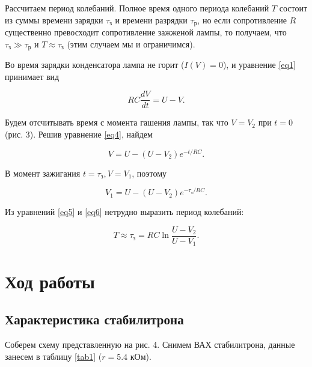 \documentclass[a4paper,14pt]{article}
\begin{document}
Рассчитаем период колебаний. Полное время одного периода колебаний $T$ состоит из суммы времени зарядки $\tau_{\text{з}}$ и времени разрядки $\tau_{\text{р}}$, но если сопротивление $R$ существенно превосходит сопротивление зажженой лампы, то получаем, что $\tau_{\text{з}} \gg \tau_{\text{р}}$ и $T \approx \tau_{\text{з}}$ (этим случаем мы и ограничимся).

Во время зарядки конденсатора лампа не горит ($I(V)=0$), и уравнение \eqref{eq1} принимает вид 

\begin{equation}
RC \dfrac{dV}{dt} = U-V.
\label{eq4}
\end{equation}

Будем отсчитывать время с момента гашения лампы, так что $V=V_2$ при $t=0$ (рис. 3). Решив уравнение \eqref{eq4}, найдем 

\begin{equation}
V = U - (U-V_2)e^{-t/RC}.
\label{eq5}
\end{equation}

В момент зажигания $t = \tau_{\text{з}}, V = V_1$, поэтому

\begin{equation}
V_1 = U - (U-V_2)e^{-\tau_{\text{з}}/RC}.
\label{eq6}
\end{equation}

Из уравнений \eqref{eq5} и \eqref{eq6} нетрудно выразить период колебаний:

\begin{equation}
T \approx \tau_{\text{з}} = RC \ln \dfrac{U-V_2}{U-V_1}.
\label{eqT}
\end{equation}

\section*{Ход работы}
\subsection*{Характеристика стабилитрона}

Соберем схему представленную на рис. 4. Снимем ВАХ стабилитрона, данные занесем в таблицу \ref{tab1} ($r = 5.4$ кОм). 
\end{document}
